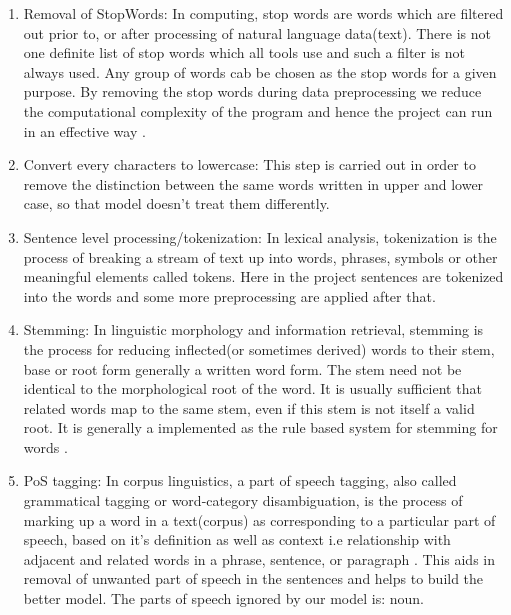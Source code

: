 \begin{enumerate}
\item Removal of StopWords:
In computing, stop words are words which are filtered out prior to, or after processing of natural language data(text). There is not one definite list of stop words which all tools use and such a filter is not always used. Any group of words cab be chosen as the stop words for a given purpose. By removing the stop words during data preprocessing we reduce the computational complexity of the program and hence the project can run in an effective way \cite{stopwords}.
\item Convert every characters to lowercase:
This step is carried out in order to remove the distinction between the same words written in upper and lower case, so that model doesn't treat them differently.
\item Sentence level processing/tokenization:
In lexical analysis, tokenization is the process of breaking a stream of text up into words, phrases, symbols or other meaningful elements called tokens. Here in the project sentences are tokenized into the words and some more preprocessing are applied after that.
\item Stemming:
In linguistic morphology and information retrieval, stemming is the process for reducing inflected(or sometimes derived) words to their stem, base or root form generally a written word form. The stem need not be identical to the morphological root of the word. It is usually sufficient that related words map to the same stem, even if this stem is not itself a valid root. It is generally a implemented as the rule based system for stemming for words \cite{porter}.
\item PoS tagging:
In corpus linguistics, a part of speech tagging, also called grammatical tagging or word-category disambiguation, is the process of marking up a word in a text(corpus) as corresponding to a particular part of speech, based on it's definition as well as context i.e relationship with adjacent and related words in a phrase, sentence, or paragraph \cite{pos}. This aids in removal of unwanted part of speech in the sentences and helps to build the better model. The parts of speech ignored by our model is: noun.
\end{enumerate}

